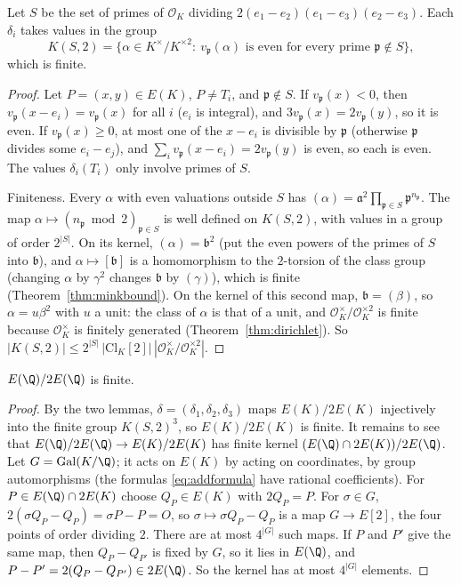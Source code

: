 \begin{lemma}\label{lem:Sfinite}
Let $S$ be the set of primes of $\mathcal O_K$ dividing $2(e_1-e_2)(e_1-e_3)(e_2-e_3)$. Each $\delta_i$ takes values in the group
\[
K(S,2)=\{\alpha\in K^\times/K^{\times2}:\ v_{\mathfrak p}(\alpha)\text{ is even for every prime }\mathfrak p\notin S\},
\]
which is finite.
\end{lemma}
\begin{proof}
Let $P=(x,y)\in E(K)$, $P\ne T_i$, and $\mathfrak p\notin S$. If $v_{\mathfrak p}(x)<0$, then $v_{\mathfrak p}(x-e_i)=v_{\mathfrak p}(x)$ for all $i$ ($e_i$ is
integral), and $3v_{\mathfrak p}(x)=2v_{\mathfrak p}(y)$, so it is even. If $v_{\mathfrak p}(x)\ge0$, at most one of the $x-e_i$ is divisible by $\mathfrak p$
(otherwise $\mathfrak p$ divides some $e_i-e_j$), and $\sum_iv_{\mathfrak p}(x-e_i)=2v_{\mathfrak p}(y)$ is even, so each is even. The values $\delta_i(T_i)$ only
involve primes of $S$.

Finiteness. Every $\alpha$ with even valuations outside $S$ has $(\alpha)=\mathfrak a^2\prod_{\mathfrak p\in S}\mathfrak p^{n_{\mathfrak p}}$. The map
$\alpha\mapsto(n_{\mathfrak p}\bmod2)_{\mathfrak p\in S}$ is well defined on $K(S,2)$, with values in a group of order $2^{|S|}$. On its kernel,
$(\alpha)=\mathfrak b^2$ (put the even powers of the primes of $S$ into $\mathfrak b$), and $\alpha\mapsto[\mathfrak b]$ is a homomorphism to the $2$-torsion of the
class group (changing $\alpha$ by $\gamma^2$ changes $\mathfrak b$ by $(\gamma)$), which is finite (Theorem~\ref{thm:minkbound}). On the kernel of this second
map, $\mathfrak b=(\beta)$, so $\alpha=u\beta^2$ with $u$ a unit: the class of $\alpha$ is that of a unit, and $\mathcal O_K^\times/\mathcal O_K^{\times2}$ is finite
because $\mathcal O_K^\times$ is finitely generated (Theorem~\ref{thm:dirichlet}). So $|K(S,2)|\le2^{|S|}\,|\mathrm{Cl}_K[2]|\,|\mathcal O_K^\times/\mathcal O_K^{\times2}|$.
\end{proof}

\begin{theorem}\label{thm:weakmw}
$E(\Q)/2E(\Q)$ is finite.
\end{theorem}
\begin{proof}
By the two lemmas, $\delta=(\delta_1,\delta_2,\delta_3)$ maps $E(K)/2E(K)$ injectively into the finite group $K(S,2)^3$, so $E(K)/2E(K)$ is finite. It remains to see
that $E(\Q)/2E(\Q)\to E(K)/2E(K)$ has finite kernel $(E(\Q)\cap2E(K))/2E(\Q)$. Let $G=\operatorname{Gal}(K/\Q)$; it acts on $E(K)$ by acting on coordinates, by
group automorphisms (the formulas \eqref{eq:addformula} have rational coefficients). For $P\in E(\Q)\cap2E(K)$ choose $Q_P\in E(K)$ with $2Q_P=P$. For
$\sigma\in G$, $2(\sigma Q_P-Q_P)=\sigma P-P=O$, so $\sigma\mapsto\sigma Q_P-Q_P$ is a map $G\to E[2]$, the four points of order dividing $2$. There are at most
$4^{|G|}$ such maps. If $P$ and $P'$ give the same map, then $Q_P-Q_{P'}$ is fixed by $G$, so it lies in $E(\Q)$, and $P-P'=2(Q_P-Q_{P'})\in2E(\Q)$. So the kernel
has at most $4^{|G|}$ elements.
\end{proof}

